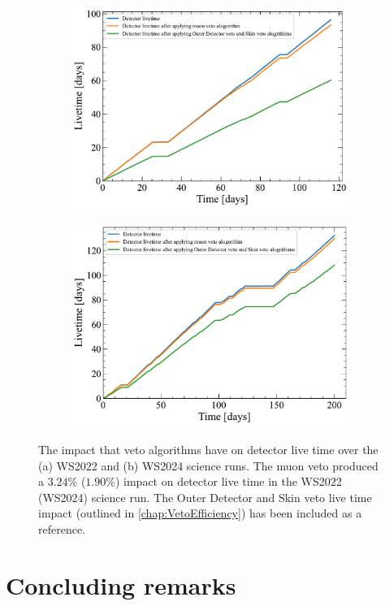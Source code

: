 \begin{figure}[ht!]
\centering
\begin{subfigure}{0.47\textwidth}
    \includegraphics[width=\textwidth]{figures/Muons/SR1WSAnalysis_SR1-WSv5_LZAP-5.4.6_v36_run_time_comparison.pdf}
    \caption{}
    \label{fig:WS2022_MuonVetoLivetimeImpact}
\end{subfigure}
\hfill
\begin{subfigure}{0.47\textwidth}
    \includegraphics[width=\textwidth]{figures/Muons/SR3-WSv5_LZAP-5.4.6_run_time_comparison.pdf}
    \caption{}
    \label{fig:WS2024_MuonVetoLivetimeImpact}
\end{subfigure}
\caption{The impact that veto algorithms have on detector live time over the (a) WS2022 and (b) WS2024 science runs. The muon veto produced a $3.24\%$ ($1.90\%$) impact on detector live time in the WS2022 (WS2024) science run. The Outer Detector and Skin veto live time impact (outlined in \autoref{chap:VetoEfficiency}) has been included as a reference.}
\label{fig:MuonVetoLivetimeImpact}
\end{figure}

\section{Concluding remarks}